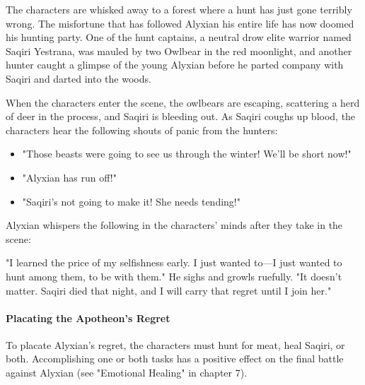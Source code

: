\documentclass[10pt,a4paper,twoside,twocolumn,openany,nodeprecatedcode]{dndbook}
\begin{document}
The characters are whisked away to a forest where a hunt has just gone terribly wrong. The misfortune that has followed Alyxian his entire life has now doomed his hunting party. One of the hunt captains, a neutral drow elite warrior named Saqiri Yestrana, was mauled by two Owlbear in the red moonlight, and another hunter caught a glimpse of the young Alyxian before he parted company with Saqiri and darted into the woods.

When the characters enter the scene, the owlbears are escaping, scattering a herd of deer in the process, and Saqiri is bleeding out. As Saqiri coughs up blood, the characters hear the following shouts of panic from the hunters:


\begin{itemize}
\item "Those beasts were going to see us through the winter! We'll be short now!"
\item "Alyxian has run off!"
\item "Saqiri's not going to make it! She needs tending!"
\end{itemize}

Alyxian whispers the following in the characters' minds after they take in the scene:

\begin{DndReadAloud}{}
"I learned the price of my selfishness early. I just wanted to—I just wanted to hunt among them, to be with them." He sighs and growls ruefully. "It doesn't matter. Saqiri died that night, and I will carry that regret until I join her."

\end{DndReadAloud}

\paragraph{Placating the Apotheon's Regret}
To placate Alyxian's regret, the characters must hunt for meat, heal Saqiri, or both. Accomplishing one or both tasks has a positive effect on the final battle against Alyxian (see "Emotional Healing" in chapter 7).
\end{document}
